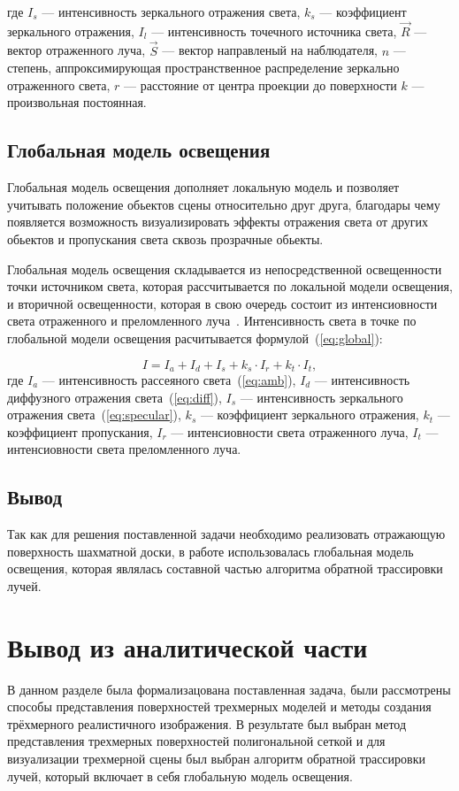 \begin{enumerate}[label=\arabic*)]
	\noindent где 
	$I_{s}$ --- интенсивность зеркального отражения света,
	$k_{s}$ --- коэффициент зеркального отражения,
	$I_{l}$ --- интенсивность точечного источника света,
	$\overrightarrow{R}$ --- вектор отраженного луча, 
	$\overrightarrow{S}$ --- вектор направленый на наблюдателя,
	$n$ ---  степень, аппроксимирующая пространственное распределение зеркально отраженного света,
	$r$ --- расстояние от центра проекции до поверхности
	$k$ --- произвольная постоянная.
	
	
\end{enumerate}

\subsection{Глобальная модель освещения}
Глобальная модель освещения дополняет локальную модель и позволяет учитывать положение обьектов сцены относительно друг друга, благодары чему появляется возможность визуализировать эффекты отражения света от других обьектов и пропускания света сквозь прозрачные обьекты.

Глобальная модель освещения складывается из непосредственной освещенности точки источником света, которая рассчитывается по локальной модели освещения, и вторичной освещенности, которая в свою очередь состоит из интенсиовности света отраженного и преломленного луча~\cite{shikin2001}. Интенсивность света в точке по глобальной модели освещения расчитывается формулой~(\ref{eq:global}):

\begin{equation}\label{global}
	I = I_{a} + I_{d} + I_{s} + k_{s} \cdot I_{r} + k_{t} \cdot I_{t},
\end{equation}
\noindent где 
	$I_{a}$ --- интенсивность рассеяного света~(\ref{eq:amb}), 
	$I_{d}$ --- интенсивность диффузного отражения света~(\ref{eq:diff}), 
	$I_{s}$ --- интенсивность зеркального отражения света~(\ref{eq:specular}),
	$k_{s}$ --- коэффициент зеркального отражения,
	$k_{t}$ --- коэффициент пропускания,
	$I_{r}$ --- интенсиовности света отраженного луча,
	$I_{t}$ --- интенсиовности света преломленного луча.
\subsection*{Вывод}
Так как для решения поставленной задачи необходимо реализовать отражающую поверхность шахматной доски, в работе использовалась глобальная модель освещения, которая являлась составной частью алгоритма обратной трассировки лучей.


\clearpage
\section*{Вывод из аналитической части}
В данном разделе была формализацована поставленная задача, были рассмотрены способы представления поверхностей трехмерных моделей и методы создания трёхмерного реалистичного изображения. В результате был выбран метод представления трехмерных поверхностей полигональной сеткой и для визуализации трехмерной сцены был выбран алгоритм обратной трассировки лучей, который включает в себя глобальную модель освещения.

\clearpage
